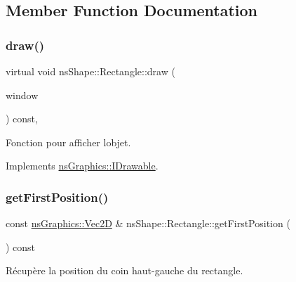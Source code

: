 \subsection{Member Function Documentation}
\mbox{\label{classns_shape_1_1_rectangle_acbe8ed9e23b67090e7638563f2593735}} 
\subsubsection{\texorpdfstring{draw()}{draw()}}
{\footnotesize\ttfamily virtual void ns\+Shape\+::\+Rectangle\+::draw (\begin{DoxyParamCaption}\item[{\hyperlink{class_min_g_l}{Min\+GL} \&}]{window }\end{DoxyParamCaption}) const\hspace{0.3cm}{\ttfamily [override]}, {\ttfamily [virtual]}}



Fonction pour afficher l\textquotesingle{}objet. 



Implements \hyperlink{classns_graphics_1_1_i_drawable_abed8a61e1d507d31e76f0891f3bf9c51}{ns\+Graphics\+::\+I\+Drawable}.

\mbox{\label{classns_shape_1_1_rectangle_a42c38f27b247f6a411a9d1a8de5ceaa4}} 
\subsubsection{\texorpdfstring{get\+First\+Position()}{getFirstPosition()}}
{\footnotesize\ttfamily const \hyperlink{classns_graphics_1_1_vec2_d}{ns\+Graphics\+::\+Vec2D} \& ns\+Shape\+::\+Rectangle\+::get\+First\+Position (\begin{DoxyParamCaption}{ }\end{DoxyParamCaption}) const}



Récupère la position du coin haut-\/gauche du rectangle. 

\mbox{\label{classns_shape_1_1_rectangle_a276bce487fbd9514fcf8e558382d0276}} 
